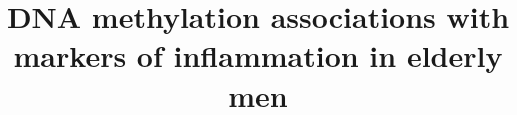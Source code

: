 \documentclass{bmcart}\usepackage[]{graphicx}\usepackage[]{color}
\begin{document}
\begin{frontmatter}

\begin{fmbox}


\title{DNA methylation associations with markers of inflammation in elderly men}


\author[
  addressref={cpmcri},                   %
  email={Daniel.Evans@ucsf.edu}   %
]{ }
\author[
  addressref={cpmcri},
  email={theresa.mau@ucsf.edu}
]{ }
\author[
  addressref={ucd},
  email={nelane@ucdavis.edu}
]{ }


\address[id=cpmcri]{%
  ,             %
  ,          %
  ,                              %
}
\address[id=ucd]{%
  ,
  ,
  ,
}


\end{fmbox}
\end{frontmatter}
\end{document}
